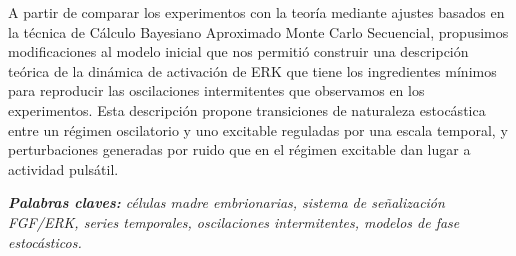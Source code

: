 \documentclass[./main.tex]{subfiles}
\begin{document}
A partir de comparar los experimentos con la teoría mediante ajustes basados en la técnica de Cálculo Bayesiano Aproximado Monte Carlo Secuencial, propusimos modificaciones al modelo inicial que nos permitió construir una descripción teórica de la dinámica de activación de ERK que tiene los ingredientes mínimos para reproducir las oscilaciones intermitentes que observamos en los experimentos. Esta descripción propone transiciones de naturaleza estocástica entre un régimen oscilatorio y uno excitable reguladas por una escala temporal, y perturbaciones generadas por ruido que en el régimen excitable dan lugar a actividad pulsátil.



\vspace{0.5cm}

\textit{\textbf{Palabras claves:} células madre embrionarias, sistema de señalización FGF/ERK, series temporales, oscilaciones intermitentes, modelos de fase estocásticos.}



\end{document}
